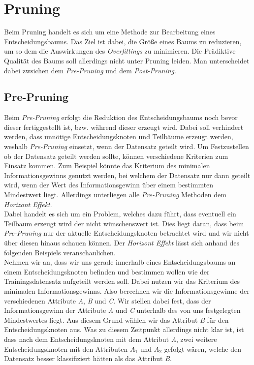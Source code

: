 \chapter{Pruning}
\label{pruning}
Beim Pruning handelt es sich um eine Methode zur Bearbeitung eines Entscheidungsbaums. Das Ziel ist dabei, die Größe eines Baums zu reduzieren, um so dem die Auswirkungen des \textit{Overfittings} zu minimieren. Die Prädiktive Qualität des Baums soll allerdings nicht unter Pruning leiden. \autocites{WikiPruning:online}{DataMining} Man unterscheidet dabei zwsichen dem \textit{Pre-Pruning} und dem \textit{Post-Pruning}. \autocite{DataMining}

\section{Pre-Pruning}
\label{pre-pruning}
Beim \textit{Pre-Pruning} erfolgt die Reduktion des Entscheidungsbaums noch bevor dieser fertiggestellt ist, bzw. während dieser erzeugt wird. Dabei soll verhindert werden, dass unnötige Entscheidungsknoten und Teilbäume erzeugt werden, weshalb \textit{Pre-Pruning} einsetzt, wenn der Datensatz geteilt wird. Um Festzustellen ob der Datensatz geteilt werden sollte, können verschiedene Kriterien zum Einsatz kommen. Zum Beispiel könnte das Kriterium des minimalen Informationsgewinns genutzt werden, bei welchem der Datensatz nur dann geteilt wird, wenn der Wert des Informationsgewinn über einem bestimmten Mindestwert liegt. \autocite{DataMining} Allerdings unterliegen alle \textit{Pre-Pruning} Methoden dem \textit{Horizont Effekt}. \autocite{WikiPruning:online}\\
Dabei handelt es sich um ein Problem, welches dazu führt, dass eventuell ein Teilbaum erzeugt wird der nicht wünschenswert ist. Dies liegt daran, dass beim \textit{Pre-Pruning} nur der aktuelle Entscheidungsknoten betrachtet wird und wir nicht über diesen hinaus schauen können. \autocites{HorizonProblem}{WikiPruning:online} Der \textit{Horizont Effekt} lässt sich anhand des folgenden Beispiels veranschaulichen.\\
Nehmen wir an, dass wir uns gerade innerhalb eines Entscheidungsbaums an einem Entscheidungsknoten befinden und bestimmen wollen wie der Trainingsdatensatz aufgeteilt werden soll. Dabei nutzen wir das Kriterium des minimalen Informationsgewinns. Also berechnen wir die Informationsgewinne der verschiedenen Attribute \textit{A}, \textit{B} und \textit{C}. Wir stellen dabei fest, dass der Informationsgewinn der Attribute \textit{A} und \textit{C} unterhalb des von uns festgelegten Mindestwertes liegt. Aus diesem Grund wählen wir das Attribut \textit{B} für den Entscheidungsknoten aus. Was zu diesem Zeitpunkt allerdings nicht klar ist, ist dass nach dem Entscheidungsknoten mit dem Attribut \textit{A}, zwei weitere Entscheidungsknoten mit den Attributen $A_{1}$ und $A_{2}$ gefolgt wären, welche den Datensatz besser klassifiziert hätten als das Attribut \textit{B}.\\

